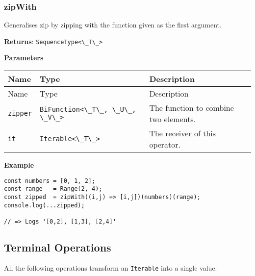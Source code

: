 \hypertarget{1a453b49-15f0-4893-ac16-295a516efc66}{%
\subsubsection{zipWith}\label{1a453b49-15f0-4893-ac16-295a516efc66}}

Generalises zip by zipping with the function given as the first
argument.

\textbf{Returns}: \passthrough{\lstinline!SequenceType<\_T\_>!}

\textbf{Parameters}

\begin{longtable}[]{
  >{\raggedright\arraybackslash}p{}
  >{\raggedright\arraybackslash}p{}
  >{\raggedright\arraybackslash}p{}@{}}

\toprule\noalign{}
Name & Type & Description \\
\midrule\noalign{}
\endfirsthead
\toprule\noalign{}
Name & Type & Description \\
\midrule\noalign{}
\endhead
\bottomrule\noalign{}
\endlastfoot
\passthrough{\lstinline!zipper!} &
\passthrough{\lstinline!BiFunction<\_T\_, \_U\_, \_V\_>!} & The function
to combine two elements. \\
\passthrough{\lstinline!it!} & \passthrough{\lstinline!Iterable<\_T\_>!}
& The receiver of this operator. \\
\end{longtable}

\textbf{Example}

\begin{lstlisting}[label=bcceae38-355f-4d33-9233-3c55fcda81d9]
const numbers = [0, 1, 2];
const range   = Range(2, 4);
const zipped  = zipWith((i,j) => [i,j])(numbers)(range);
console.log(...zipped);
                                                        
// => Logs '[0,2], [1,3], [2,4]'
\end{lstlisting}

\hypertarget{fe5771c4-997c-4878-97c6-42d757c1418a}{%
\subsection{Terminal Operations}\label{sub:appendix_terminal_operations}}

All the following operations transform an
\passthrough{\lstinline!Iterable!} into a single value.

